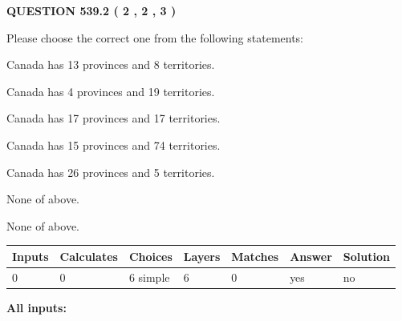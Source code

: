 \documentclass[12pt]{article}
\begin{document}
   
  
\vspace{0.2in}
  
{\textbf{\Large{QUESTION
539.2 
 ( 2 , 2 , 3 )
}}}
  
  
Please choose the correct one from the following statements:
 
 
Canada has  13 provinces and  8 territories.
 
 
Canada has   4 provinces and  19 territories.
 
 
Canada has  17 provinces and  17 territories.
 
 
Canada has  15 provinces and  74 territories.
 
 
Canada has  26 provinces and  5 territories.
 
 
 None of above.
 
 
\noindent{}
 
 
 None of above.
 
 
\noindent{}
 
 
   
   
   
   
\noindent\begin{tabular}{|l|l|l|l|l|l|l|}
 \hline
Inputs & Calculates & Choices & Layers & Matches & Answer & Solution \\ \hline
 0  & 
 0  & 
 6
  simple  
  & 
 6  & 
 0  & 
  yes & 
  no 
  \\ \hline
 \end{tabular}
   
   
   
   
\noindent{}
   
   
   
   
\noindent\vspace{0.1in}\hspace{-0.08in} {\textbf{\Large{All inputs: }}}
   
   
   
   
   
   
 \vspace{0.2in}
 
\end{document}
